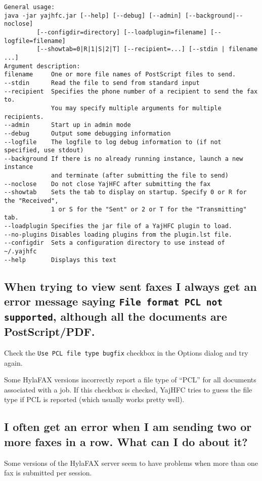 \documentclass[a4paper,10pt]{scrartcl}
\begin{document}
\begin{verbatim}
General usage:
java -jar yajhfc.jar [--help] [--debug] [--admin] [--background|--noclose]
         [--configdir=directory] [--loadplugin=filename] [--logfile=filename]
         [--showtab=0|R|1|S|2|T] [--recipient=...] [--stdin | filename ...]
Argument description:
filename     One or more file names of PostScript files to send.
--stdin      Read the file to send from standard input
--recipient  Specifies the phone number of a recipient to send the fax to.
             You may specify multiple arguments for multiple recipients.
--admin      Start up in admin mode
--debug      Output some debugging information
--logfile    The logfile to log debug information to (if not specified, use stdout)
--background If there is no already running instance, launch a new instance
             and terminate (after submitting the file to send)
--noclose    Do not close YajHFC after submitting the fax
--showtab    Sets the tab to display on startup. Specify 0 or R for the "Received",
             1 or S for the "Sent" or 2 or T for the "Transmitting" tab.
--loadplugin Specifies the jar file of a YajHFC plugin to load.
--no-plugins Disables loading plugins from the plugin.lst file.
--configdir  Sets a configuration directory to use instead of ~/.yajhfc
--help       Displays this text
\end{verbatim}


\subsection{When trying to view sent faxes I always get an error message saying 
   \texttt{File format PCL not supported}, although all the documents are PostScript/PDF.}

Check the \texttt{Use PCL file type bugfix} checkbox in the Options dialog and try again.

Some HylaFAX versions incorrectly report a file type of ``PCL'' for all documents
associated with a job. If this checkbox is checked, YajHFC tries to guess the
file type if PCL is reported (which usually works pretty well).

\subsection{I often get an error when I am sending two or more faxes in a row. What can I do about it?}

Some versions of the HylaFAX server seem to have problems when more than one fax is submitted per session.
\end{document}
